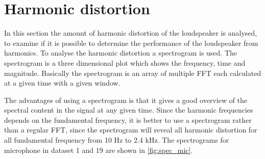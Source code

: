 \section{Harmonic distortion}

In this section the amount of harmonic distortion of the loudspeaker is analysed, to examine if it is possible to determine the performance of the loudspeaker from harmonics. To analyse the harmonic distortion a spectrogram is used. The spectrogram is a three dimensional plot which shows the frequency, time and magnitude. Basically the spectrogram is an array of multiple FFT each calculated at a given time with a given window.

The advantages of using a spectrogram is that it gives a good overview of the spectral content in the signal at any given time. Since the harmonic frequencies depends on the fundamental frequency, it is better to use a spectrogram rather than a regular FFT, since the spectrogram will reveal all harmonic distortion for all fundamental frequency from 10 Hz to 2.4 kHz. The spectrograms for microphone in dataset 1 and 19 are shown in \autoref{fig:spec_mic}.

